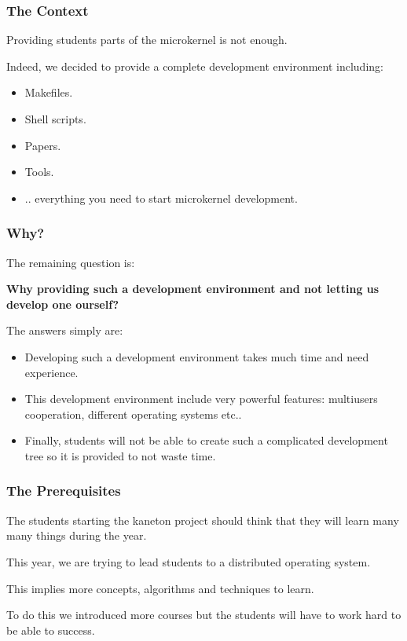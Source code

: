 
\begin{frame}
  \frametitle{The Context}

  Providing students parts of the microkernel is not enough.

  \nl

  Indeed, we decided to provide a complete development environment
  including:

  \begin{itemize}
    \item
      Makefiles.
    \item
      Shell scripts.
    \item
      Papers.
    \item
      Tools.
    \item
      .. everything you need to start microkernel development.
  \end{itemize}
\end{frame}


\begin{frame}
  \frametitle{Why?}

  The remaining question is:

  \nl

  \textbf{Why providing such a development environment and not letting us
    develop one ourself?}

  \nl

  The answers simply are:

  \begin{itemize}
    \item
      Developing such a development environment takes much time and
      need experience.
    \item
      This development environment include very powerful features:
      multiusers cooperation, different operating systems etc..
    \item
      Finally, students will not be able to create such a complicated
      development tree so it is provided to not waste time.
  \end{itemize}
\end{frame}


\begin{frame}
  \frametitle{The Prerequisites}

  The students starting the kaneton project should think that they
  will learn many many things during the year.

  \nl

  This year, we are trying to lead students to a distributed operating
  system.

  \nl

  This implies more concepts, algorithms and techniques to learn.

  \nl

  To do this we introduced more courses but the students will have
  to work hard to be able to success.
\end{frame}

